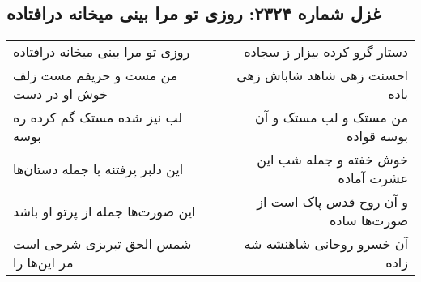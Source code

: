 \begin{center}
\section*{غزل شماره ۲۳۲۴: روزی تو مرا بینی میخانه درافتاده}
\label{sec:2324}
\begin{longtable}{l p{0.5cm} r}
روزی تو مرا بینی میخانه درافتاده
&&
دستار گرو کرده بیزار ز سجاده
\\
من مست و حریفم مست زلف خوش او در دست
&&
احسنت زهی شاهد شاباش زهی باده
\\
لب نیز شده مستک گم کرده ره بوسه
&&
من مستک و لب مستک و آن بوسه قواده
\\
این دلبر پرفتنه با جمله دستان‌ها
&&
خوش خفته و جمله شب این عشرت آماده
\\
این صورت‌ها جمله از پرتو او باشد
&&
و آن روح قدس پاک است از صورت‌ها ساده
\\
شمس الحق تبریزی شرحی است مر این‌ها را
&&
آن خسرو روحانی شاهنشه شه زاده
\\
\end{longtable}
\end{center}
